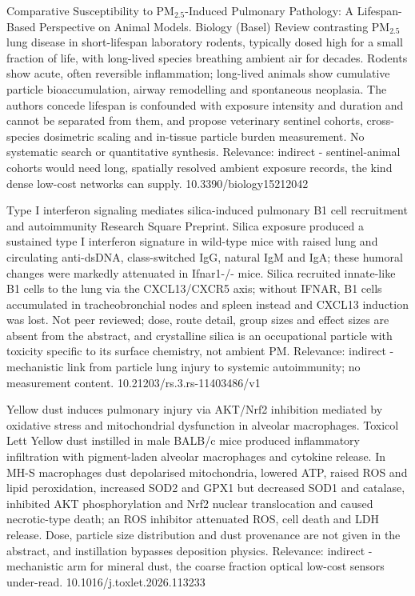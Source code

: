 \documentclass[10pt]{article}
\begin{document}
{Comparative Susceptibility to PM$_{2.5}$-Induced Pulmonary Pathology: A Lifespan-Based Perspective on Animal Models.}
{Biology (Basel)}
{Review contrasting PM$_{2.5}$ lung disease in short-lifespan laboratory rodents, typically dosed high for a small fraction of life, with long-lived species breathing ambient air for decades. Rodents show acute, often reversible inflammation; long-lived animals show cumulative particle bioaccumulation, airway remodelling and spontaneous neoplasia. The authors concede lifespan is confounded with exposure intensity and duration and cannot be separated from them, and propose veterinary sentinel cohorts, cross-species dosimetric scaling and in-tissue particle burden measurement. No systematic search or quantitative synthesis. Relevance: indirect - sentinel-animal cohorts would need long, spatially resolved ambient exposure records, the kind dense low-cost networks can supply.}
{10.3390/biology15212042}

{Type I interferon signaling mediates silica-induced pulmonary B1 cell recruitment and autoimmunity}
{Research Square}
{Preprint. Silica exposure produced a sustained type I interferon signature in wild-type mice with raised lung and circulating anti-dsDNA, class-switched IgG, natural IgM and IgA; these humoral changes were markedly attenuated in Ifnar1-/- mice. Silica recruited innate-like B1 cells to the lung via the CXCL13/CXCR5 axis; without IFNAR, B1 cells accumulated in tracheobronchial nodes and spleen instead and CXCL13 induction was lost. Not peer reviewed; dose, route detail, group sizes and effect sizes are absent from the abstract, and crystalline silica is an occupational particle with toxicity specific to its surface chemistry, not ambient PM. Relevance: indirect - mechanistic link from particle lung injury to systemic autoimmunity; no measurement content.}
{10.21203/rs.3.rs-11403486/v1}

{Yellow dust induces pulmonary injury via AKT/Nrf2 inhibition mediated by oxidative stress and mitochondrial dysfunction in alveolar macrophages.}
{Toxicol Lett}
{Yellow dust instilled in male BALB/c mice produced inflammatory infiltration with pigment-laden alveolar macrophages and cytokine release. In MH-S macrophages dust depolarised mitochondria, lowered ATP, raised ROS and lipid peroxidation, increased SOD2 and GPX1 but decreased SOD1 and catalase, inhibited AKT phosphorylation and Nrf2 nuclear translocation and caused necrotic-type death; an ROS inhibitor attenuated ROS, cell death and LDH release. Dose, particle size distribution and dust provenance are not given in the abstract, and instillation bypasses deposition physics. Relevance: indirect - mechanistic arm for mineral dust, the coarse fraction optical low-cost sensors under-read.}
{10.1016/j.toxlet.2026.113233}
\end{document}
